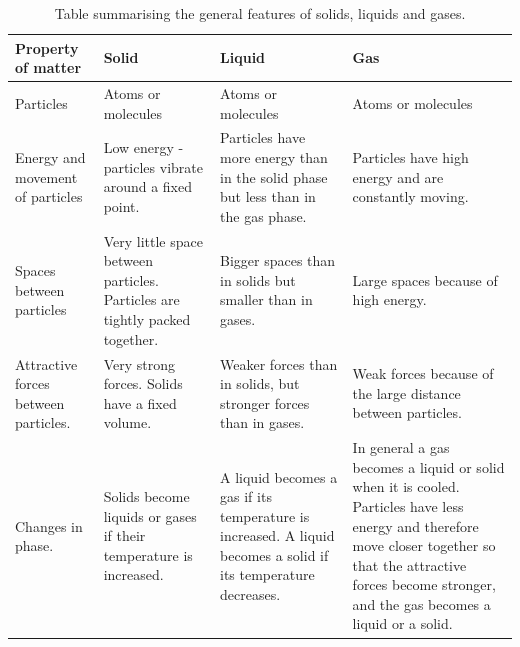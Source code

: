 \begin{table}[h]
\begin{center}
\caption{Table summarising the general features of solids, liquids and gases.}
\label{tab:microscopic:kinetic theory}
\begin{tabular}{|p{3cm}|p{3cm}|p{3cm}|p{3cm}|}\hline
\textbf{Property of matter} & \textbf{Solid} & \textbf{Liquid} & \textbf{Gas} \\\hline
Particles & Atoms or molecules & Atoms or molecules & Atoms or molecules \\\hline
Energy and movement of particles & Low energy - particles vibrate around a fixed point. & Particles have more energy than in the solid phase but less than in the gas phase. & Particles have high energy and are constantly moving.  \\\hline
Spaces between particles & Very little space between particles. Particles are tightly packed together. & Bigger spaces than in solids but smaller than in gases. & Large spaces because of high energy.  \\\hline
Attractive forces between particles. & Very strong forces. Solids have a fixed volume. & Weaker forces than in solids, but stronger forces than in gases. & Weak forces because of the large distance between particles.  \\\hline
Changes in phase. & Solids become liquids or gases if their temperature is increased. & A liquid becomes a gas if its temperature is increased. A liquid becomes a solid if its temperature decreases. & In general a gas becomes a liquid or solid when it is cooled. Particles have less energy and therefore move closer together so that the attractive forces become stronger, and the gas becomes a liquid or a solid.  \\\hline
\end{tabular}
\end{center}
\end{table}
    \par
